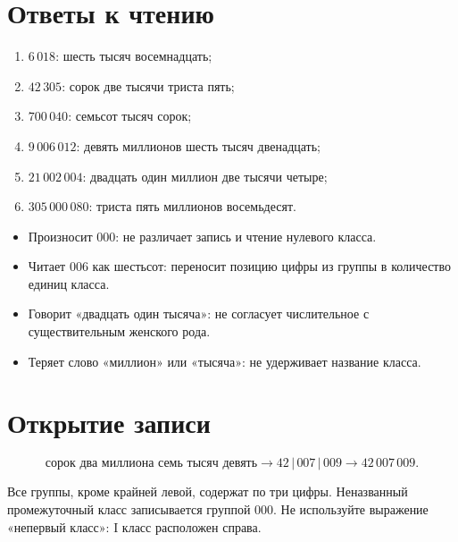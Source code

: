 \newpage
\section{Ответы к чтению}

\begin{teacherbox}
  \begin{enumerate}
    \item \(6\,018\): шесть тысяч восемнадцать;
    \item \(42\,305\): сорок две тысячи триста пять;
    \item \(700\,040\): семьсот тысяч сорок;
    \item \(9\,006\,012\): девять миллионов шесть тысяч двенадцать;
    \item \(21\,002\,004\): двадцать один миллион две тысячи четыре;
    \item \(305\,000\,080\): триста пять миллионов восемьдесят.
  \end{enumerate}
\end{teacherbox}

\begin{teacherbox}
  \begin{itemize}
    \item Произносит \(000\): не различает запись и чтение нулевого класса.
    \item Читает \(006\) как шестьсот: переносит позицию цифры из группы в
      количество единиц класса.
    \item Говорит «двадцать один тысяча»: не согласует числительное с
      существительным женского рода.
    \item Теряет слово «миллион» или «тысяча»: не удерживает название класса.
  \end{itemize}
\end{teacherbox}

\section{Открытие записи}

\[
  \text{сорок два миллиона семь тысяч девять}
  \longrightarrow 42\,|\,007\,|\,009
  \longrightarrow 42\,007\,009.
\]

\begin{teacherbox}
  Все группы, кроме крайней левой, содержат по три цифры. Неназванный
  промежуточный класс записывается группой \(000\). Не используйте выражение
  «непервый класс»: I класс расположен справа.
\end{teacherbox}

